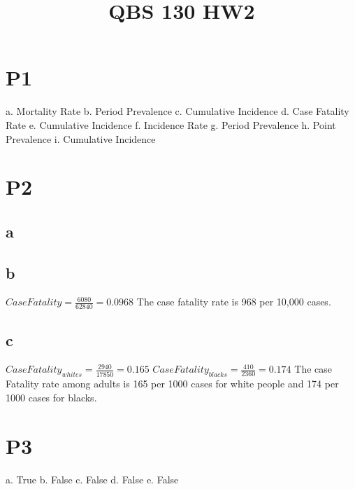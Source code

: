 \documentclass[paper=letter, fontsize=12pt]{article}
\title{\vspace{-15mm}\fontsize{24pt}{10pt}\selectfont\textbf{QBS 130 HW2 }} %
\date{}
\begin{document}
\maketitle %
\thispagestyle{fancy} %


\section{P1}

a. Mortality Rate
\newline
b. Period Prevalence
\newline
c. Cumulative Incidence
\newline
d. Case Fatality Rate
\newline
e. Cumulative Incidence 
\newline
f. Incidence Rate
\newline
g. Period Prevalence 
\newline
h. Point Prevalence
\newline
i. Cumulative Incidence

\newpage

\section{P2}
\subsection{a}

\subsection{b}
$Case Fatality = \frac{6080}{62840} = 0.0968$
The case fatality rate is 968 per 10,000 cases.

\subsection{c}
$Case Fatality_{whites} = \frac{2940}{17850} = 0.165$
\newline
$Case Fatality_{blacks} = \frac{410}{2360} = 0.174$
\newline
The case Fatality rate among adults  is 165 per 1000 cases for white people and 174 per 1000 cases for blacks.

\newpage
\section{P3}
a. True
\newline
b. False
\newline
c. False
\newline
d. False
\newline
e. False
\end{document}
